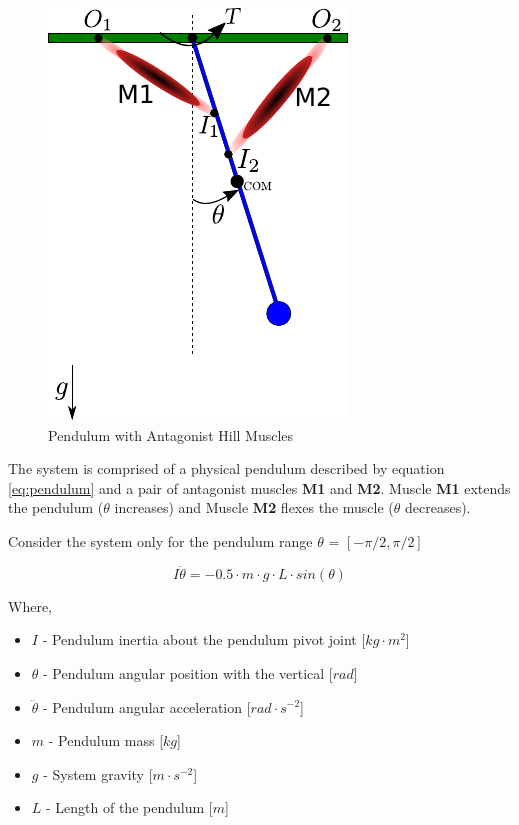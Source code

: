 \documentclass{cmc}
\begin{document}
\begin{figure}[H]
  \centering \includegraphics[scale=1.0]{figures/pendulum_muscles.pdf}
  \caption{Pendulum with Antagonist Hill Muscles}
  \label{fig:p_muscles}
\end{figure}

The system is comprised of a physical pendulum described by equation
\ref{eq:pendulum} and a pair of antagonist muscles \textbf{M1} and
\textbf{M2}. Muscle \textbf{M1} extends the pendulum ($\theta$
increases) and Muscle \textbf{M2} flexes the muscle ($\theta$
decreases).

Consider the system only for the pendulum range $\theta$ =
$[-\pi/2, \pi/2]$

\begin{equation}
  \label{eq:pendulum}
  I\ddot{\theta} = -0.5 \cdot m \cdot g \cdot L \cdot sin(\theta)
\end{equation}

Where,

\begin{itemize}
\item $I$ - Pendulum inertia about the pendulum pivot joint
  [$kg \cdot m^2$]
\item $\theta$ - Pendulum angular position with the vertical [$rad$]
\item $\ddot{\theta}$ - Pendulum angular acceleration
  [$rad \cdot s^{-2}$]
\item $m$ - Pendulum mass [$kg$]
\item $g$ - System gravity [$m \cdot s^{-2}$]
\item $L$ - Length of the pendulum [$m$]
\end{itemize}
\end{document}
